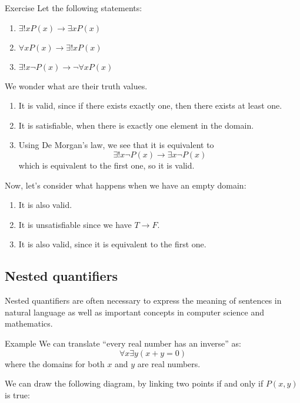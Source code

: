 \documentclass{article}
\begin{document}
\begin{parag}{Exercise}
    Let the following statements: 
    \begin{enumerate}
        \item $\exists!x P\left(x\right) \to \exists x P\left(x\right)$
        \item $\forall x P\left(x\right) \to \exists!x P\left(x\right)$
        \item $\exists!x \lnot P\left(x\right) \to \lnot \forall x P\left(x\right)$
    \end{enumerate}
    
    We wonder what are their truth values.

    \begin{enumerate}
        \item It is valid, since if there exists exactly one, then there exists at least one.
        \item It is satisfiable, when there is exactly one element in the domain.
        \item Using De Morgan's law, we see that it is equivalent to
        \[\exists! x \lnot P\left(x\right) \to \exists x \lnot P\left(x\right)\]
        which is equivalent to the first one, so it is valid.
    \end{enumerate}
    
    Now, let's consider what happens when we have an empty domain:
    \begin{enumerate}
        \item It is also valid.
        \item It is unsatisfiable since we have $T \to F$.
        \item It is also valid, since it is equivalent to the first one.
    \end{enumerate}
\end{parag}

\subsection{Nested quantifiers}
\begin{parag}{Nested quantifiers}
     are often necessary to express the meaning of sentences in natural language as well as important concepts in computer science and mathematics.

    \begin{subparag}{Example}
        We can translate ``every real number has an inverse'' as: 
        \[\forall x \exists y\left(x + y = 0\right)\]
        where the domains for both $x$ and $y$ are real numbers.
    \end{subparag}

    We can draw the following diagram, by linking two points if and only if $P\left(x, y\right)$ is true:
\end{parag}
\end{document}
